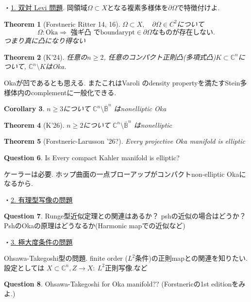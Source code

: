 \documentclass[dvipdfmx,a4paper,11pt]{article} %
\newtheorem{thm}{Theorem}[section]
\newtheorem{cor}[thm]{Corollary}
\theoremstyle{definition}
\newtheorem{ques}[thm]{Question}
\theoremstyle{remark}
\numberwithin{equation}{section}
\begin{document}
・\underline{1. 双対 Levi 問題}.
岡領域$\Omega\subset X$となる複素多様体を$\partial\Omega$で特徴付けよ.

\begin{thm}[Forstneric Ritter 14, 16]
$\Omega\subset X,\quad \partial\Omega\in C^2$について
\[
\Omega:\mathrm{Oka}
\Longrightarrow
\text{ 強ギ凸 で}  \mathrm{boundary pt}\in\partial\Omega \text{なものが存在しない}.
\]
つまり真に凸になり得ない
\end{thm}
\begin{thm}[K'24]
任意の$n\ge 2$, 任意のコンパクト正則凸(多項式凸)$K\subset\mathbb C^n$について, $\mathbb C^n\setminus K$はOka.
\end{thm}
Okaが凹であるとも思える. またこれはVaroli のdensity propertyを満たすStein多様体内のcomplementに一般化できる. 
\begin{cor}
$n\ge 3$について
$\mathbb C^n\setminus \overline{\mathbb B}^n$
はnonelliptic Oka
\end{cor}
\begin{thm}[K'26]
$n\ge 2$について
$\mathbb C^n\setminus \overline{\mathbb B}^n$
はnonelliptic 
\end{thm}

\begin{thm}[Forstneric-Larusson  '26?]
Every projective Oka manifold  is elliptic
\end{thm}

\begin{ques}
Is Every compact Kahler manifold  is elliptic?
\end{ques}
ケーラーは必要. ホップ曲面の一点ブローアップがコンパクトnon-elliptic Okaになるから. 

・\underline{2. 有理型写像の問題}

\begin{ques}
Runge型近似定理との関連はあるか？
pshの近似の場合はどうか？
PshのOkaの原理はどうなるか(Harmonic mapでの近似など)
\end{ques}

・\underline{3. 極大度条件の問題}

Ohsawa-Takegoshi型の問題. finite order ($L^2$条件)の正則mapとの関連を知りたい. 
設定としては
\(X\subset\mathbb C^n, Z\longrightarrow X:\ L^2\text{正則写像}.
\)など

\begin{ques}
Ohsawa-Takegoshi for Oka manifold?? (Forstnericの1st editionをみよ.)
\end{ques}


\end{document}
